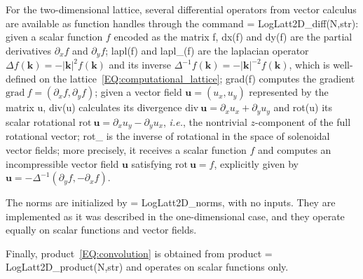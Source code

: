 \documentclass[12pt]{article}
\theoremstyle{definition}
\begin{document}
	For the two-dimensional lattice, several differential operators from vector calculus are available as function handles through the command { = LogLatt2D\_diff(N,str)}:
	given a scalar function $f$ encoded as the matrix {\mlttfamily f}, {\mlttfamily dx(f)} and {\mlttfamily dy(f)} are the partial derivatives $\partial_xf$ and $\partial_yf$;
	{\mlttfamily lapl(f)} and {\mlttfamily lapl\_(f)} are the laplacian operator $\Delta f(\mathbf{k}) = -|\mathbf{k}|^2f(\mathbf{k})$ and its inverse $\Delta^{-1} f(\mathbf{k}) = -|\mathbf{k}|^{-2}f(\mathbf{k})$, which is well-defined on the lattice~\eqref{EQ:computational_lattice};
	{\mlttfamily grad(f)} computes the gradient $\text{grad} \ f = (\partial_x f, \partial_y f)$;
	given a vector field $\mathbf{u} = (u_x,u_y)$ represented by the matrix {\mlttfamily u}, {\mlttfamily div(u)} calculates its divergence $\text{div} \ \mathbf{u} = \partial_x u_x + \partial_y u_y$ and {\mlttfamily rot(u)} its scalar rotational $\text{rot} \ \mathbf{u} = \partial_x u_y - \partial_y u_x$, \textit{i.e.}, the nontrivial $z$-component of the full rotational vector;
	{\mlttfamily rot\_} is the inverse of rotational in the space of solenoidal vector fields; more precisely, it receives a scalar function $f$ and computes an incompressible vector field $\mathbf{u}$ satisfying $\text{rot} \ \mathbf{u} = f$, explicitly given by $\mathbf{u} = -\Delta^{-1}(\partial_yf, -\partial_x f)$.
	
	The norms are initialized by { = LogLatt2D\_norms}, with no inputs.
	They are implemented as it was described in the one-dimensional case, and they operate equally on scalar functions and vector fields.
	
	Finally, product~\eqref{EQ:convolution} is obtained from {\mlttfamily product = LogLatt2D\_product(N,str)} and operates on scalar functions only.
	
\end{document}
